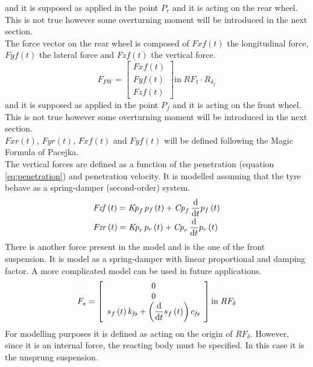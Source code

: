 and it is supposed as applied in the point $P_r$ and it is acting on the rear wheel. This is not true however some overturning moment will be introduced in the next section.\\
The force vector on the rear wheel is composed of $Fxf(t)$ the longitudinal force, $Fyf(t)$ the lateral force and $Fzf(t)$ the vertical force.
%
\begin{equation}
    F_{FW} = 
    \left[
    \begin{array}{c}
        Fxf(t)\\
        Fyf(t)\\
        Fzf(t)
    \end{array}
    \right ]
    \text{in} \; RF_1 \cdot R_{\delta_f}
\end{equation}
%
and it is supposed as applied in the point $P_f$ and it is acting on the front wheel. This is not true however some overturning moment will be introduced in the next section.\\
$Fxr(t)$, $Fyr(t)$, $Fxf(t)$ and $Fyf(t)$ will be defined following the Magic Formula of Pacejka\cite{pacejka2006tyre}.\\
The vertical forces are defined as a function of the penetration (equation \ref{eq:penetration}) and penetration velocity. It is modelled assuming that the tyre behave as a spring-damper (second-order) system.
%
\begin{equation}
\begin{array}{l} 
\displaystyle {\it Fzf} \left( t \right) ={\it Kp}_{f}\,p_
{f} \left( t \right) +{\it Cp}_{f}\,{\frac {\rm d}{{\rm d}t}}p_{f}
\left( t \right) \\[6pt]
\displaystyle {\it Fzr} \left( t \right) ={
\it Kp}_{r}\,p_{r} \left( t \right) +{\it Cp}_{r}\,{\frac {\rm d}{
{\rm d}t}}p_{r} \left( t \right) 
\end{array} 
\end{equation}
%
There is another force present in the model and is the one of the front suspension. It is model as a spring-damper with linear proportional and damping factor. A more complicated model can be used in future applications.
%
\begin{equation}
    F_{s} = 
    \left[
    \begin{array}{c}
        0\\
        0\\
        \displaystyle s_{f} \left( t \right) k_{{\it fs}}+ \left( {\frac {\rm d}{{\rm d}t}}s_{f} \left( t \right)  \right) c_{{\it fs}}
    \end{array}
    \right ]
    \text{in} \; RF_\delta
\end{equation}
%
For modelling purposes it is defined as acting on the origin of $RF_\delta$. However, since it is an internal force, the reacting body must be specified. In this case it is the unsprung suspension.
%
